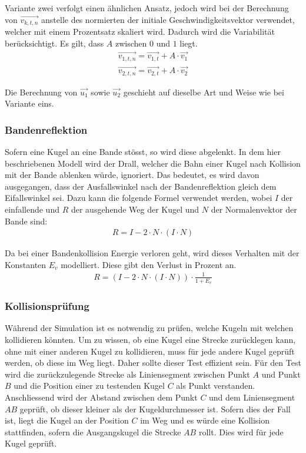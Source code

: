 Variante zwei verfolgt einen ähnlichen Ansatz, jedoch wird bei der Berechnung von $\vec{v_{k,t,n}}$ anstelle des normierten
der initiale Geschwindigkeitsvektor verwendet, welcher mit einem Prozentsatz skaliert wird. Dadurch wird die Variabilität
berücksichtigt. Es gilt, dass $A$ zwischen $0$ und $1$ liegt.
\begin{align}
    \vec{v_{1,t,n}} = \vec{v_{1,t}} + A \cdot \vec{v_1}\\
    \vec{v_{2,t,n}} = \vec{v_{2,t}} + A \cdot \vec{v_2}
\end{align}

Die Berechnung von $\vec{u_1}$ sowie $\vec{u_2}$ geschieht auf dieselbe Art und Weise wie bei Variante eins.

\newpage
\subsubsection{Bandenreflektion}
Sofern eine Kugel an eine Bande stösst, so wird diese abgelenkt. In dem hier beschriebenen Modell wird der Drall\cite{wiki.spin:1},
welcher die Bahn einer Kugel nach Kollision mit der Bande ablenken würde, ignoriert.
Das bedeutet, es wird davon ausgegangen, dass der Ausfallswinkel nach der Bandenreflektion gleich dem Eifallswinkel sei.
Dazu kann die folgende Formel\cite{paulbourke.reflected_ray:1} verwendet werden, wobei $I$ der einfallende
und $R$ der ausgehende Weg der Kugel und $N$ der Normalenvektor der Bande sind:
\begin{align}
    R = I - 2 \cdot N \cdot (I \cdot N)
\end{align}

Da bei einer Bandenkollision Energie verloren geht, wird dieses Verhalten mit der Konstanten $E_v$ modelliert.
Diese gibt den Verlust in Prozent an.
\begin{align}
    R = (I - 2 \cdot N \cdot (I \cdot N)) \cdot \frac{1}{1 + E_v}
\end{align}
\subsubsection{Kollisionsprüfung}
Während der Simulation ist es notwendig zu prüfen, welche Kugeln mit welchen kollidieren könnten.
Um zu wissen, ob eine Kugel eine Strecke zurücklegen kann, ohne mit einer anderen Kugel zu kollidieren,
muss für jede andere Kugel geprüft werden, ob diese im Weg liegt. Daher sollte dieser Test effizient sein.
Für den Test wird die zurückzulegende Strecke als Liniensegment zwischen Punkt $A$ und Punkt $B$ und die Position
einer zu testenden Kugel $C$ als Punkt verstanden. Anschliessend wird der Abstand zwischen dem Punkt $C$ und dem
Liniensegment $AB$ geprüft, ob dieser kleiner als der Kugeldurchmesser ist. Sofern dies der Fall ist, liegt die Kugel an
der Position $C$ im Weg und es würde eine Kollision stattfinden, sofern die Ausgangskugel die Strecke $AB$ rollt.
Dies wird für jede Kugel geprüft.


